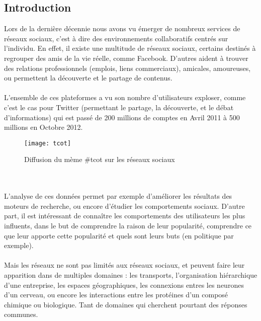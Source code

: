 \begin{titlepage}

\newpage
\begin{center}
\begin{bf}
\section{Introduction}
\end{bf}
\end{center}

\vspace{1cm}
{
Lors de la dernière décennie nous avons vu émerger de nombreux services de réseaux sociaux, c'est à dire des environnements collaboratifs centrés sur l'individu. En effet, il existe une multitude de réseaux sociaux, certains destinés à regrouper des amis de la vie réelle, comme Facebook. D'autres aident à trouver des relations professionnels (emplois, liens commerciaux), amicales, amoureuses, ou permettent la découverte et le partage de contenus.
\\ \\
L'ensemble de ces plateformes a vu son nombre d'utilisateurs exploser, comme c'est le cas pour Twitter (permettant le partage, la découverte, et le débat d'informations) qui est passé de 200 millions de comptes en Avril 2011 à 500 millions en Octobre 2012.
\begin{figure}[h]
\centering
\texttt{[image: tcot]}
\caption{Diffusion du mème \#tcot sur les réseaux sociaux}
\end{figure}
\\ \\
L'analyse de ces données permet par exemple d'améliorer les résultats des moteurs de recherche, ou encore d'étudier les comportements sociaux. D'autre part, il est intéressant de connaître les comportements des utilisateurs les plus influents, dans le but de comprendre la raison de leur popularité, comprendre ce que leur apporte cette popularité et quels sont leurs buts (en politique par exemple).
\\ \\
Mais les réseaux ne sont pas limités aux réseaux sociaux, et peuvent faire leur apparition dans de multiples domaines : les transports, l'organisation hiérarchique d'une entreprise, les espaces géographiques, les connexions entres les neurones d'un cerveau, ou encore les interactions entre les protéines d'un composé chimique ou biologique. Tant de domaines qui cherchent pourtant des réponses communes.
}
\end{titlepage}
